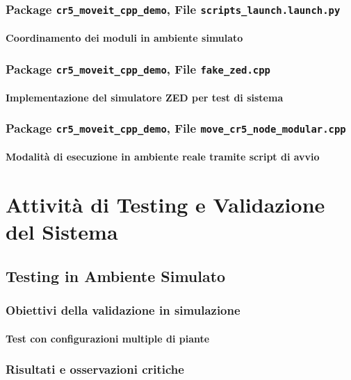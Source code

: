 \documentclass[12pt,a4paper,twoside,openright]{book}
\begin{document}
	\subsection{Package \texttt{cr5\_moveit\_cpp\_demo}, File \texttt{scripts\_launch.launch.py}}
	\subsubsection{Coordinamento dei moduli in ambiente simulato}
	
	\subsection{Package \texttt{cr5\_moveit\_cpp\_demo}, File \texttt{fake\_zed.cpp}}
	\subsubsection{Implementazione del simulatore ZED per test di sistema}
	
	\subsection{Package \texttt{cr5\_moveit\_cpp\_demo}, File \texttt{move\_cr5\_node\_modular.cpp}}
	\subsubsection{Modalità di esecuzione in ambiente reale tramite script di avvio}
	
	
	\chapter{Attività di Testing e Validazione del Sistema}
	\section{Testing in Ambiente Simulato}
	\subsection{Obiettivi della validazione in simulazione}
	\subsubsection{Test con configurazioni multiple di piante}
	\subsection{Risultati e osservazioni critiche}
\end{document}
